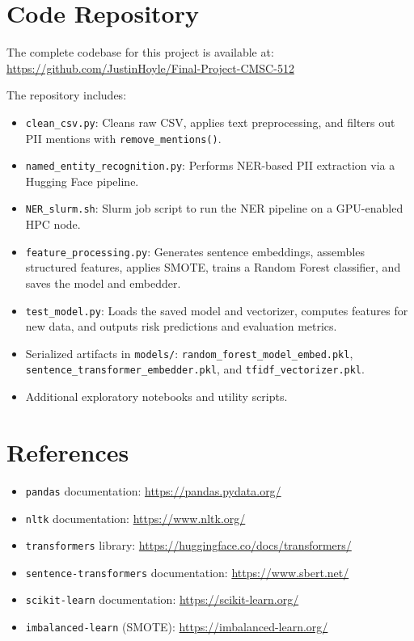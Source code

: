 \documentclass{article}
\begin{document}
\section{Code Repository}
The complete codebase for this project is available at:
\url{https://github.com/JustinHoyle/Final-Project-CMSC-512}

The repository includes:
\begin{itemize}
    \item \texttt{clean\_csv.py}: Cleans raw CSV, applies text preprocessing, and filters out PII mentions with \texttt{remove\_mentions()}.
    \item \texttt{named\_entity\_recognition.py}: Performs NER-based PII extraction via a Hugging Face pipeline.
    \item \texttt{NER\_slurm.sh}: Slurm job script to run the NER pipeline on a GPU-enabled HPC node.
    \item \texttt{feature\_processing.py}: Generates sentence embeddings, assembles structured features, applies SMOTE, trains a Random Forest classifier, and saves the model and embedder.
    \item \texttt{test\_model.py}: Loads the saved model and vectorizer, computes features for new data, and outputs risk predictions and evaluation metrics.
    \item Serialized artifacts in \texttt{models/}: \texttt{random\_forest\_model\_embed.pkl}, \texttt{sentence\_transformer\_embedder.pkl}, and \texttt{tfidf\_vectorizer.pkl}.
    \item Additional exploratory notebooks and utility scripts.
\end{itemize}

\section*{References}
\begin{itemize}
    \item \texttt{pandas} documentation: \url{https://pandas.pydata.org/}
    \item \texttt{nltk} documentation: \url{https://www.nltk.org/}
    \item \texttt{transformers} library: \url{https://huggingface.co/docs/transformers/}
    \item \texttt{sentence-transformers} documentation: \url{https://www.sbert.net/}
    \item \texttt{scikit-learn} documentation: \url{https://scikit-learn.org/}
    \item \texttt{imbalanced-learn} (SMOTE): \url{https://imbalanced-learn.org/}
\end{itemize}
\end{document}
